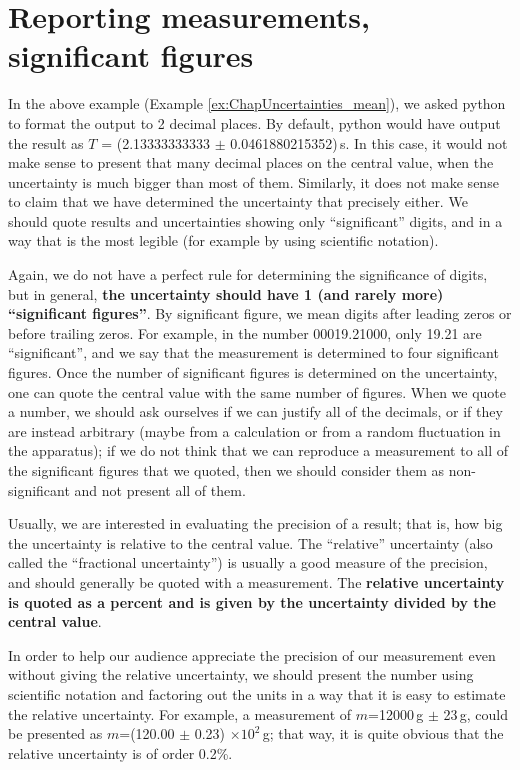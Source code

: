 \section{Reporting measurements, significant figures}
In the above example (Example \ref{ex:ChapUncertainties_mean}), we asked python to format the output to 2 decimal places. By default, python would have output the result as $T$ = (2.13333333333 $\pm$ 0.0461880215352)\,s. In this case, it would not make sense to present that many decimal places on the central value, when the uncertainty is much bigger than most of them. Similarly, it does not make sense to claim that we have determined the uncertainty that precisely either. We should quote results and uncertainties showing only ``significant'' digits, and in a way that is the most legible (for example by using scientific notation).

Again, we do not have a perfect rule for determining the significance of digits, but in general, \textbf{the uncertainty should have 1 (and rarely more) ``significant figures''}. By significant figure, we mean digits after leading zeros or before trailing zeros. For example, in the number 00019.21000, only 19.21 are ``significant'', and we say that the measurement is determined to four significant figures. Once the number of significant figures is determined on the uncertainty, one can quote the central value with the same number of figures. When we quote a number, we should ask ourselves if we can justify all of the decimals, or if they are instead arbitrary (maybe from a calculation or from a random fluctuation in the apparatus); if we do not think that we can reproduce a measurement to all of the significant figures that we quoted, then we should consider them as non-significant and not present all of them.

Usually, we are interested in evaluating the precision of a result; that is, how big the uncertainty is relative to the central value. The ``relative'' uncertainty (also called the ``fractional uncertainty'') is usually a good measure of the precision, and should generally be quoted with a measurement. The \textbf{relative uncertainty is quoted as a percent and is given by the uncertainty divided by the central value}.

In order to help our audience appreciate the precision of our measurement even without giving the relative uncertainty, we should present the number using scientific notation and factoring out the units in a way that it is easy to estimate the relative uncertainty. For example, a measurement of $m$=12000\,g $\pm$ 23\,g, could be presented as $m$=(120.00 $\pm$ 0.23) $\times 10^2$\,g; that way, it is quite obvious that the relative uncertainty is of order 0.2\%.

